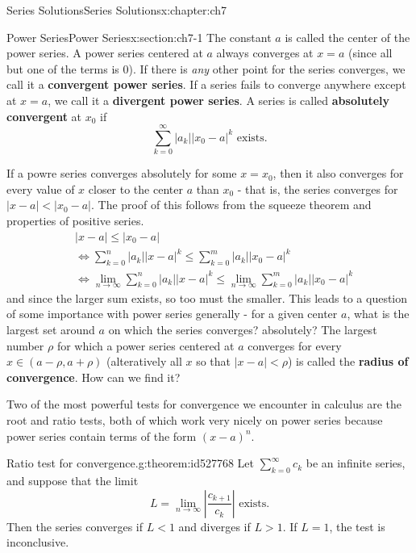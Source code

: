 \documentclass[oneside,10pt,]{book}
\newcommand{\terminology}[1]{\textbf{#1}}
\numberwithin{equation}{section}
\newcommand{\abs}[1]{\left\vert#1\right\vert}
\numberwithin{equation}{section}
\newcommand{\lt}{<}
\newcommand{\amp}{&}
\begin{document}
\begin{chapterptx}{Series Solutions}{}{Series Solutions}{}{}{x:chapter:ch7}
\begin{sectionptx}{Power Series}{}{Power Series}{}{}{x:section:ch7-1}
The constant \(a\) is called the center of the power series. A power series centered at \(a\) always converges at \(x = a\) (since all but one of the terms is \(0\)). If there is \emph{any} other point for the series converges, we call it a \terminology{convergent power series}. If a series fails to converge anywhere except at \(x = a\), we call it a \terminology{divergent power series}. A series is called \terminology{absolutely convergent} at \(x_0\) if%
\begin{equation*}
\sum_{k=0}^\infty \abs{a_k} \abs{ x_0-a}^k \text{ exists.}
\end{equation*}
%
\par
If a powre series converges absolutely for some \(x = x_0\), then it also converges for every value of \(x\) closer to the center \(a\) than \(x_0\) - that is, the series converges for \(\abs{x - a} \lt \abs{x_0 - a}\). The proof of this follows from the squeeze theorem and properties of positive series.%
\begin{align*}
\amp \abs{x - a} \leq \abs{x_0 - a}\\
\amp \Leftrightarrow \sum_{k=0}^n \abs{a_k}\abs{x - a}^k \leq \sum_{k=0}^m \abs{a_k}\abs{x_0 - a}^k\\
\amp \Leftrightarrow \lim_{n \to \infty} \sum_{k=0}^n \abs{a_k}\abs{x - a}^k \leq \lim_{n \to \infty} \sum_{k=0}^m \abs{a_k}\abs{x_0 - a}^k
\end{align*}
and since the larger sum exists, so too must the smaller. This leads to a question of some importance with power series generally - for a given center \(a\), what is the largest set around \(a\) on which the series converges? absolutely? The largest number \(\rho\) for which a power series centered at \(a\) converges for every \(x \in (a - \rho, a + \rho)\) (alteratively all \(x\) so that \(\abs{x - a} \lt \rho\)) is called the \terminology{radius of convergence}. How can we find it?%
\par
Two of the most powerful tests for convergence we encounter in calculus are the root and ratio tests, both of which work very nicely on power series because power series contain terms of the form \((x-a)^n\).%
\begin{theorem}{Ratio test for convergence.}{}{g:theorem:id527768}%
Let \(\sum_{k=0}^\infty c_k\) be an infinite series, and suppose that the limit%
\begin{equation*}
L = \lim_{n\to\infty} \abs{\frac{c_{k+1}}{c_k}} \text{ exists.}
\end{equation*}
Then the series converges if \(L \lt 1\) and diverges if \(L > 1\). If \(L = 1\), the test is inconclusive.%

\end{theorem}
\end{sectionptx}
\end{chapterptx}
\end{document}
